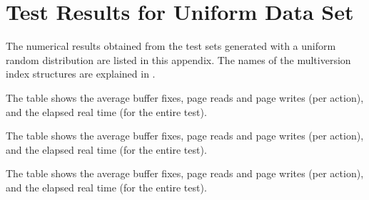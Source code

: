 \chapter{Test Results for Uniform Data Set}
\label{appendix:test-results-uniform}

The numerical results obtained from the test sets generated with a uniform
random distribution are listed in this appendix.
The names of the multiversion index structures are explained in
.

\begin{table}[htb]
\begin{center}

\caption{Names of the database index structures.}
\label{table:test-database-names-uniform}
\end{center}
\end{table}

\begin{table}[htb]
\begin{center}

{The table shows the average buffer fixes, page reads and page writes (per
action), and the elapsed real time (for the entire test).}
\label{table:qu-initial-5-summary-uniform}
\end{center}
\end{table}

\begin{table}[htb]
\begin{center}

{The table shows the average buffer fixes, page reads and page writes (per
action), and the elapsed real time (for the entire test).}
\label{table:qu-initial-100-summary-uniform}
\end{center}
\end{table}


\begin{table}[htb]
\begin{center}

% 
{The table shows the average buffer fixes, page reads and page writes (per
action), and the elapsed real time (for the entire test).}
\label{table:qu-del-50-5-summary-uniform}
\end{center}
\end{table}

